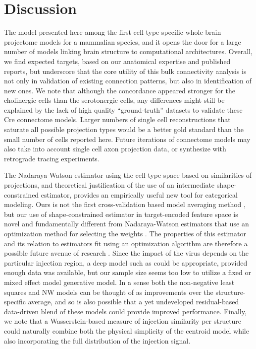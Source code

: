 \section{Discussion}

The model presented here among the first cell-type specific whole brain projectome models for a mammalian species, and it opens the door for a large number of models linking brain structure to computational architectures. 
Overall, we find expected targets, based on our anatomical expertise and published reports, but underscore that the core utility of this bulk connectivity analysis is not only in validation of existing connection patterns, but also in identification of new ones.
We note that although the concordance appeared stronger for the cholinergic cells than the serotonergic cells, any differences might still be explained by the lack of high quality “ground-truth” datasets to validate these Cre connectome models.
Larger numbers of single cell reconstructions that saturate all possible projection types would be a better gold standard than the small number of cells reported here.
Future iterations of connectome models may also take into account single cell axon projection data, or synthesize with retrograde tracing experiments.

The Nadaraya-Watson estimator using the cell-type space based on similarities of projections, and theoretical justification of the use of an intermediate shape-constrained estimator, provides an empirically useful new tool for categorical modeling.
Ours is not the first cross-validation based model averaging method \citet{Gao2016-qe}, but our use of shape-constrained estimator in target-encoded feature space is novel and fundamentally different from Nadaraya-Watson estimators that use an optimization method for selecting the weights \citep{Saul2003-th}.
The properties of this estimator and its relation to estimators fit using an optimization algorithm are therefore a possible future avenue of research \citep{Groeneboom2018-ow, Salha_undated-ev}.
Since the impact of the virus depends on the particular injection region, a deep model such as \citet{Lotfollahi2019-tr} could be appropriate, provided enough data was available, but our sample size seems too low to utilize a fixed or mixed effect model generative model.
In a sense both the non-negative least squares \citet{Oh2014-kh} and NW models can be thought of as improvements over the structure-specific average, and so is also possible that a yet undeveloped residual-based data-driven blend of these models could provide improved performance.
Finally, we note that a Wasserstein-based measure of injection similarity per structure could naturally combine both the physical simplicity of the centroid model while also incorporating the full distribution of the injection signal.

